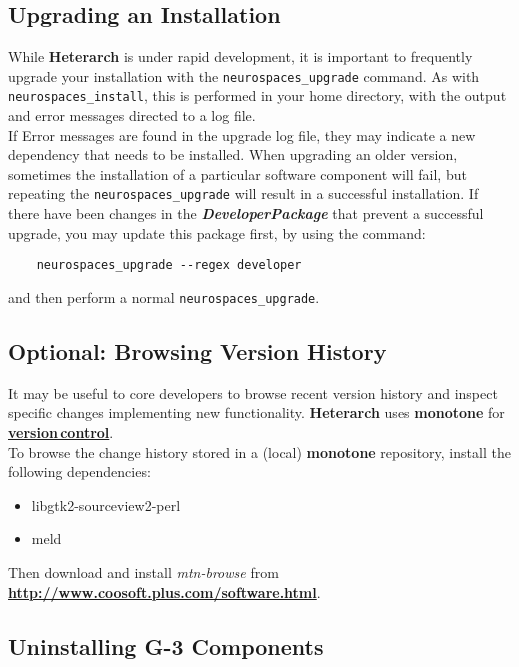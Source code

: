 \documentclass[12pt]{article}
\begin{document}
\subsection*{Upgrading an Installation}

While {\bf\small{Heterarch}} is under rapid development, it is important to frequently
upgrade your installation with the {\tt neurospaces\_upgrade} command.
As with {\tt neurospaces\_install}, this is performed in your home
directory, with the output and error messages directed to a log file.\\
If Error messages are found in the upgrade log file, they may indicate
a new dependency that needs to be installed.  When upgrading an older
version, sometimes the installation of a particular software component
will fail, but repeating the {\tt neurospaces\_upgrade} will result in a
successful installation.  If there have been changes in the {\bf{\emph{DeveloperPackage}}} that prevent a successful upgrade, you may update
this package first, by using the command:

\begin{verbatim}
    neurospaces_upgrade --regex developer
\end{verbatim}
and then perform a normal {\tt neurospaces\_upgrade}.
 
\subsection*{Optional: Browsing Version History}

It may be useful to core developers to browse recent version history
and inspect specific changes implementing new functionality.  {\bf\small Heterarch} uses {\bf monotone} for
\href{../version-control/version-control.tex}{\bf version\,control}.\\
To browse the change history stored in a (local) {\bf monotone}
repository, install the following dependencies:

\begin{itemize}[noitemsep,nolistsep]
\item libgtk2-sourceview2-perl
\item meld
\end{itemize}
Then download and install {\it mtn-browse} from
\href{http://www.coosoft.plus.com/software.html}{\bf http://www.coosoft.plus.com/software.html}.

\subsection*{Uninstalling G-3 Components}
\end{document}
